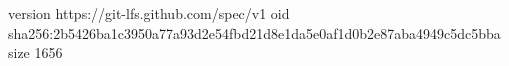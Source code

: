 version https://git-lfs.github.com/spec/v1
oid sha256:2b5426ba1c3950a77a93d2e54fbd21d8e1da5e0af1d0b2e87aba4949c5dc5bba
size 1656
